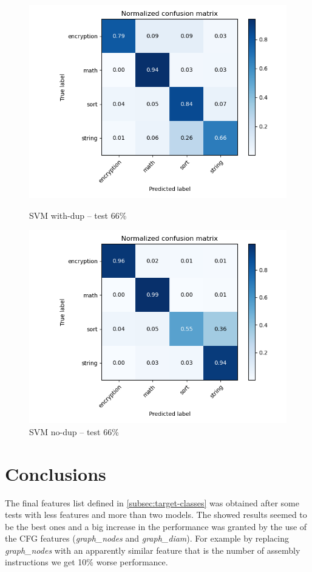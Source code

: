 \documentclass[11pt]{article}
\begin{document}
	\begin{figure}[H]
		\centering
		\begin{minipage}{.5\textwidth}
		  \centering
		  \includegraphics[width=\linewidth]{assets/svc_dup_0.66.png}
		  \caption{SVM with-dup -- test 66\%}
		\end{minipage}%
		\begin{minipage}{.5\textwidth}
		  \centering
		  \includegraphics[width=\linewidth]{assets/svc_nodup_0.66.png}
		  \caption{SVM no-dup -- test 66\%}
		\end{minipage}
	\end{figure}	



	\section{Conclusions}
	The final features list defined in \autoref{subsec:target-classes} was obtained
	after some tests with less features and more than two models. The showed results
	seemed to be the best ones and a big increase in the performance was granted
	by the use of the CFG features (\textit{graph\_nodes} and \textit{graph\_diam}).
	For example by replacing \textit{graph\_nodes} with an apparently similar feature
	that is the number of assembly instructions we get 10\% worse performance.
	
\end{document}
